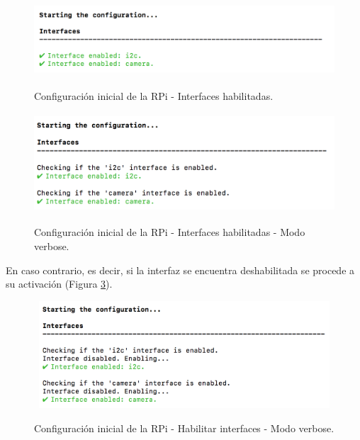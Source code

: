 \documentclass[12pt,a4paper, twoside]{report}
\begin{document}
	 \begin{figure}[!ht]   
		\caption{Configuración inicial de la RPi - Interfaces habilitadas.} 
		\begin{center} 
			\includegraphics[width=12cm,height=2.8cm]{Images/userGuide/setup/interfaceEnabled} \\
			\label{fig:userguide_setup_interface} 
		\end{center}  
	\end{figure}
			
	\begin{figure}[!ht]   
		\caption{Configuración inicial de la RPi - Interfaces habilitadas - Modo verbose.} 
		\begin{center} 
			\includegraphics[width=12cm,height=3.7cm]{Images/userGuide/setup/interfaceEnabledVerbose} \\
			\label{fig:userguide_setup_interface_verbose} 
		\end{center}  
	\end{figure}
		
	En caso contrario, es decir, si la interfaz se encuentra deshabilitada se procede a su activación (Figura \ref{fig:userguide_setup_enableinterface_verbose}).

	\newpage
	
	\begin{figure}[!ht]   
		\caption{Configuración inicial de la RPi - Habilitar interfaces - Modo verbose.} 
		\begin{center} 
			\includegraphics[width=12cm,height=4cm]{Images/userGuide/setup/enableInterfaceVerbose} \\
			\label{fig:userguide_setup_enableinterface_verbose} 
		\end{center}  
	\end{figure}
	
\end{document}
